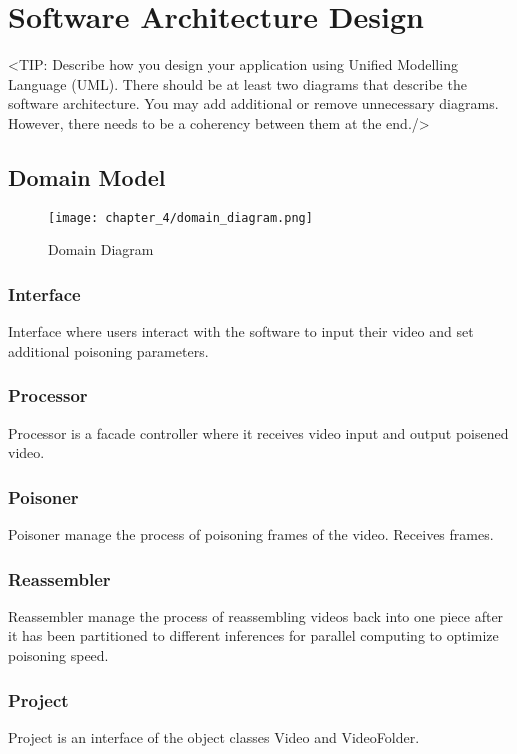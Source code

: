 \chapter{Software Architecture Design}
\label{chap:software-architecture-design}
<TIP: Describe how you design your application using Unified Modelling
Language (UML). There should be at least two diagrams that describe the
software architecture. You may add additional or remove unnecessary diagrams.
However, there needs to be a coherency between them at the end./>

\section{Domain Model}
\label{section:domain-model}
\begin{figure}[h]
    \centering
    \texttt{[image: chapter\_4/domain\_diagram.png]}
    \caption{Domain Diagram}
\end{figure}

\subsection{Interface}
Interface where users interact with the software to input their video and set additional poisoning parameters.

\subsection{Processor}
Processor is a facade controller where it receives video input and output poisened video.

\subsection{Poisoner}
Poisoner manage the process of poisoning frames of the video. Receives frames.

\subsection{Reassembler}
Reassembler manage the process of reassembling videos back into one piece after it has been partitioned to different inferences for parallel computing to optimize poisoning speed.

\subsection{Project}
Project is an interface of the object classes Video and VideoFolder.

